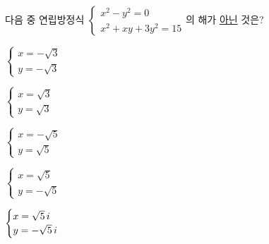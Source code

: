 다음 중 연립방정식 $\begin{cases} x^2-y^2=0 \\ x^2+xy+3y^2=15 \end{cases}$의 해가 \underline{아닌} 것은?
\begin{choices32}{\rule[-3ex]{0pt}{8ex}$\begin{cases} x=-\sqrt{3} \\ y=-\sqrt{3} \end{cases}$}{\rule[-3ex]{0pt}{8ex}$\begin{cases} x=\sqrt{3} \\ y=\sqrt{3} \end{cases}$}{\rule[-3ex]{0pt}{8ex}$\begin{cases} x=-\sqrt{5} \\ y=\sqrt{5} \end{cases}$}{\rule[-3ex]{0pt}{8ex}$\begin{cases} x=\sqrt{5} \\ y=-\sqrt{5} \end{cases}$}{\rule[-3ex]{0pt}{8ex}$\begin{cases} x=\sqrt{5}\mkern3mu i \\ y=-\sqrt{5}\mkern3mu i \end{cases}$}\end{choices32}
